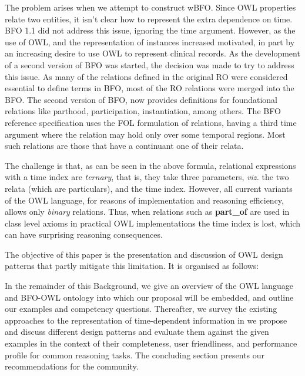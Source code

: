 The problem arises when we attempt to construct wBFO. Since OWL
properties relate two entities, it isn't clear how to represent the
extra dependence on time. BFO 1.1 did not address this issue, ignoring
the time argument. However, as the use of OWL, and the representation
of instances increased motivated, in part by an increasing desire to
use OWL to represent clinical records. As the development of a second
version of BFO was started, the decision was made to try to address
this issue. As many of the relations defined in the original RO were
considered essential to define terms in BFO, most of the RO relations
were merged into the BFO. The second version of BFO, now provides
definitions for foundational relations like parthood, participation,
instantiation, among others. The BFO reference specification uses the
FOL formulation of relations, having a third time argument where the
relation may hold only over some temporal regions. Most such relations
are those that have a continuant one of their relata.

The challenge is that, as can be seen in the above formula, relational expressions with a time index are \emph{ternary}, that is, they take three parameters, \emph{viz.} the two relata (which are particulars), and the time index. However, all current variants of the OWL language, for reasons of implementation and reasoning efficiency, allows only \emph{binary} relations. 
Thus, when relations such as \textbf{part\_of} are used in class level axioms
in practical OWL implementations 
the time index is lost, which can have surprising reasoning consequences. 


The objective of this paper is the presentation and discussion of OWL design patterns that partly mitigate this limitation. It is organised as follows:

In the remainder of this Background, we give an overview of the OWL language and BFO-OWL ontology into which our proposal will be embedded, and outline our examples and competency questions.
Thereafter, we survey the existing approaches to the representation of time-dependent information in
we propose and discuss different design patterns and evaluate them against the given examples in the context of their completeness, user friendliness, and performance profile for common reasoning tasks.
The concluding section presents our recommendations for the community.


